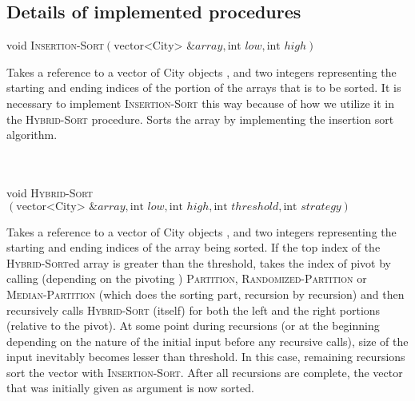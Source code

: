 \subsection{Details of implemented procedures}
\noindent void \textsc{Insertion-Sort}$(\text{vector<City> \&} array, \text{int } low, \text{int } high)$\\
\begin{indent}
    Takes a reference to a vector of City objects , and two integers representing the starting  and ending  indices of the portion of the arrays that is to be sorted. It is necessary to implement \textsc{Insertion-Sort} this way because of how we utilize it in the \textsc{Hybrid-Sort} procedure. Sorts the array by implementing the insertion sort algorithm.
\end{indent}
\\
\\
\noindent void \textsc{Hybrid-Sort}$(\text{vector<City> \&} array, \text{int } low, \text{int }high, \text{int }threshold, \text{int }strategy)$\\
\begin{indent}
Takes a reference to a vector of City objects , and two integers representing the starting  and ending  indices of the array being sorted. If the top index of the \textsc{Hybrid-Sort}ed array is greater than the threshold, takes the index of pivot by calling (depending on the pivoting ) \textsc{Partition}, \textsc{Randomized-Partition} or \textsc{Median-Partition} (which does the sorting part, recursion by recursion) and then recursively calls \textsc{Hybrid-Sort} (itself) for both the left and the right portions (relative to the pivot). At some point during recursions (or at the beginning depending on the nature of the initial input before any recursive calls), size of the input  inevitably becomes lesser than threshold. In this case, remaining recursions sort the vector with \textsc{Insertion-Sort}. After all recursions are complete, the vector that was initially given as argument is now sorted. 
\end{indent}